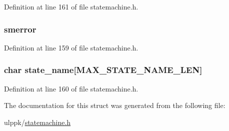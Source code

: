 Definition at line 161 of file statemachine.\-h.

\hypertarget{struct_s_m___t_x___e_r_r_o_r_a6906146f5ccfb5982af9c4553ebba49a}{
\subsubsection[{smerror}]{ smerror}}\label{struct_s_m___t_x___e_r_r_o_r_a6906146f5ccfb5982af9c4553ebba49a}


Definition at line 159 of file statemachine.\-h.

\hypertarget{struct_s_m___t_x___e_r_r_o_r_a6ef692bc2cb17ff774b80d244d265e2a}{
\subsubsection[{state\-\_\-name}]{\setlength{\rightskip}{0pt plus 5cm}char state\-\_\-name\mbox{[}{\bf M\-A\-X\-\_\-\-S\-T\-A\-T\-E\-\_\-\-N\-A\-M\-E\-\_\-\-L\-E\-N}\mbox{]}}}\label{struct_s_m___t_x___e_r_r_o_r_a6ef692bc2cb17ff774b80d244d265e2a}


Definition at line 160 of file statemachine.\-h.



The documentation for this struct was generated from the following file\-:\begin{DoxyCompactItemize}
\item 
ulppk/\hyperlink{statemachine_8h}{statemachine.\-h}\end{DoxyCompactItemize}
